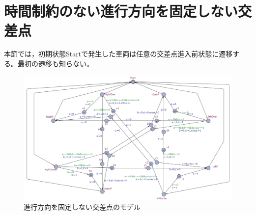 \documentclass{tpu-sotu}
\begin{document}
	\section{時間制約のない進行方向を固定しない交差点}
	本節では，初期状態Startで発生した車両は任意の交差点進入前状態に遷移する。最初の遷移も知らない。
	\begin{figure}[htbp]
	\centering
	\includegraphics[width=145mm]{IntersectionBig.png}
	\caption{進行方向を固定しない交差点のモデル}
	\label{IB}
	\end{figure}
	
\end{document}

